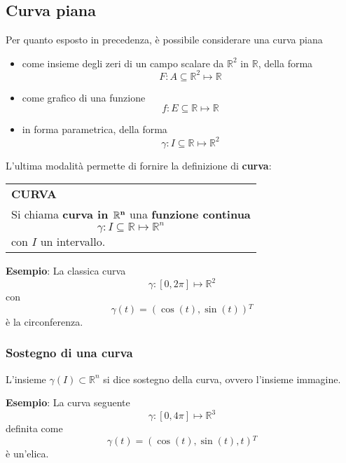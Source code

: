 \documentclass[a4paper]{extarticle}
\renewcommand\arraystretch{}
\begin{document}
\vspace{1em}
\noindent
\subsection{Curva piana}
Per quanto esposto in precedenza, è possibile considerare una curva piana
\begin{itemize}
    \item come insieme degli zeri di un campo scalare da $\mathbb{R}^2$ in $\mathbb{R}$, della forma
    \[F : A \subseteq \mathbb{R}^2 \longmapsto \mathbb{R}\]
    \item come grafico di una funzione
    \[f : E \subseteq \mathbb{R} \longmapsto \mathbb{R}\]
    \item in forma parametrica, della forma
    \[\gamma : I \subseteq \mathbb{R} \longmapsto \mathbb{R}^2\]
\end{itemize}
L'ultima modalità permette di fornire la definizione di \textbf{curva}:

\vspace{1em}
\setlength{\tabcolsep}{14pt}
\renewcommand{\arraystretch}{2}
\noindent
\begin{tabularx}{\textwidth}{@{}|P|@{}}
    \hline
    {\textbf{CURVA}}\\
    \parbox{\linewidth}{Si chiama \textbf{curva in $\bf{\mathbb{R}^n}$} una \textbf{funzione continua}
    \[\gamma : I \subseteq \mathbb{R} \longmapsto \mathbb{R}^n\]
    con $I$ un intervallo. \vspace{3mm}}\\
    \hline
\end{tabularx}

\vspace{2em}
\noindent
\textbf{Esempio}: La classica curva
\[\gamma : [0,2\pi] \longmapsto \mathbb{R}^2\]
con
\[\gamma(t) = \left(\cos(t),\sin(t)\right){^T}\]
è la circonferenza.

\vspace{1em}
\noindent
\subsubsection{Sostegno di una curva}
L'insieme $\gamma(I) \subset \mathbb{R}^n$ si dice sostegno della curva, ovvero l'insieme immagine.

\vspace{1em}
\noindent
\textbf{Esempio}: La curva seguente
\[\gamma : [0,4\pi] \longmapsto \mathbb{R}^3\]
definita come
\[\gamma(t) = \left(\cos(t),\sin(t),t\right){^T}\]
è un'elica.
\end{document}
